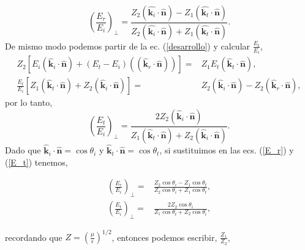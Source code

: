\documentclass[11pt,fleqn]{book} %
\begin{document}
\begin{equation}  \label{E_r}
\left(\frac{E_r}{E_i}\right)_{\perp}=\frac{Z_2(\hat{\textbf{k}_i}\cdot\hat{\textbf{n}})-Z_1(\hat{\textbf{k}_t}\cdot\hat{\textbf{n}})}{Z_2(\hat{\textbf{k}_i}\cdot\hat{\textbf{n}})+Z_1(\hat{\textbf{k}_t}\cdot\hat{\textbf{n}})}.
\end{equation}
De mismo modo podemos partir de la ec. (\ref{desarrollo}) y calcular $\frac{E_t}{E_i}$,
\begin{equation*}
\begin{split}
Z_2\left[ E_i (\hat{\textbf{k}}_i\cdot\hat{\textbf{n}})+(E_t-E_i)((\hat{\textbf{k}}_r\cdot\hat{\textbf{n}})) \right]=&Z_1E_t(\hat{\textbf{k}}_t\cdot\hat{\textbf{n}}),\\
\frac{E_t}{E_i}\left[ Z_1(\hat{\textbf{k}}_t\cdot\hat{\textbf{n}})+Z_2(\hat{\textbf{k}}_i\cdot\hat{\textbf{n}}) \right]=&Z_2(\hat{\textbf{k}}_i\cdot\hat{\textbf{n}})-Z_2(\hat{\textbf{k}}_r\cdot\hat{\textbf{n}}),
\end{split}
\end{equation*}
por lo tanto,
\begin{equation}   \label{E_t}
\left(\frac{E_t}{E_i}\right)_{\perp}=\frac{2Z_2(\hat{\textbf{k}}_i\cdot\hat{\textbf{n}})}{Z_1(\hat{\textbf{k}}_t\cdot\hat{\textbf{n}})+Z_2(\hat{\textbf{k}}_i\cdot\hat{\textbf{n}})}.
\end{equation}
Dado que $\hat{\textbf{k}}_i\cdot\hat{\textbf{n}}=\cos \theta_i$ y $\hat{\textbf{k}}_t\cdot\hat{\textbf{n}}=\cos \theta_t$, si sustituimos en las ecs. (\ref{E_r}) y (\ref{E_t}) tenemos,

\begin{equation}
\begin{split}  \label{fresn}
\left(\frac{E_r}{E_i}\right)_{\perp}=&\frac{Z_2\cos \theta_i-Z_1\cos \theta_t}{Z_2\cos \theta_i+Z_1\cos \theta_t},\\
\left(\frac{E_t}{E_i}\right)_{\perp}=&\frac{2Z_2\cos \theta_i}{Z_1\cos \theta_t+Z_2\cos \theta_i},
\end{split}
\end{equation}

recordando que $Z=\left( \frac{\mu}{\epsilon} \right)^{1/2}$, entonces podemos escribir, $\frac{Z_1}{Z_2}$,
\end{document}
